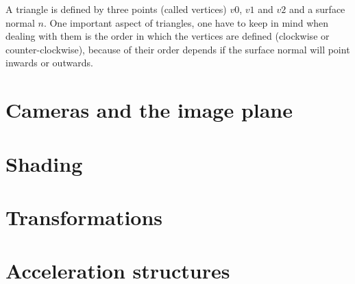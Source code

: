 \documentclass{article}
\begin{document}
A triangle is defined by three points (called vertices) $v0$, $v1$ and $v2$ and a surface normal $n$. One important aspect of triangles, one have to keep in mind when dealing with them is the order in which the vertices are defined (clockwise or counter-clockwise), because of their order depends if the surface normal will point inwards or outwards. 







\section{Cameras and the image plane}
\label{sec:cameras}


\section{Shading}
\label{sec:shading}


\section{Transformations}
\label{sec:transform}


\section{Acceleration structures}
\label{sec:accel}
\end{document}
